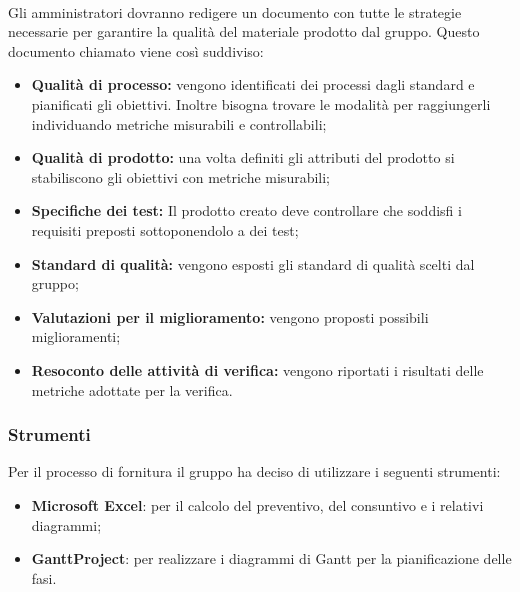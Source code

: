 \paragraph{\PdQ} Gli amministratori dovranno redigere un documento con tutte le strategie necessarie per garantire la qualità del materiale prodotto dal gruppo. Questo documento chiamato \PdQv{} viene così suddiviso:
\begin{itemize}
    \item \textbf{Qualità di processo:} vengono identificati dei processi dagli standard e pianificati gli obiettivi. Inoltre bisogna trovare le modalità per raggiungerli individuando metriche misurabili e controllabili;
    
    \item \textbf{Qualità di prodotto:} una volta definiti gli attributi del prodotto si stabiliscono gli obiettivi con metriche misurabili;
    
    \item \textbf{Specifiche dei test:} Il prodotto creato deve controllare che soddisfi i requisiti preposti sottoponendolo a dei test;
    
    \item \textbf{Standard di qualità:} vengono esposti gli standard di qualità scelti dal gruppo;
    
    \item \textbf{Valutazioni per il miglioramento:} vengono proposti possibili miglioramenti;
    
    \item \textbf{Resoconto delle attività di verifica:} vengono riportati i risultati delle metriche adottate per la verifica.
\end{itemize}

\subsubsection{Strumenti}
Per il processo di fornitura il gruppo ha deciso di utilizzare i seguenti strumenti:
\begin{itemize}
    \item \textbf{Microsoft Excel}: per il calcolo del preventivo, del consuntivo e i relativi diagrammi;
    \item \textbf{GanttProject}: per realizzare i diagrammi di Gantt per la pianificazione delle fasi.
\end{itemize}
